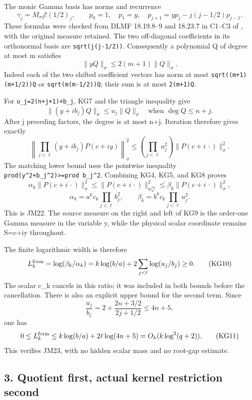 \documentclass[11pt]{article}
\begin{document}
The monic Gamma basis has norms and recurrence \[
\gamma_j=M_\sigma j!(1/2)_j,\qquad
p_0=1,\quad p_1=y,\quad
p_{j+1}=yp_j-j(j-1/2)p_{j-1}.
\tag{KG6}
\] These formulas were checked from DLMF 18.19.8--9 and 18.23.7 in C1--C3 of , with the original measure retained. The two off-diagonal coefficients in its orthonormal basis are \texttt{sqrt(j(j-1/2))}. Consequently a polynomial Q of degree at most m satisfies \[
\|yQ\|_\sigma\le2(m+1)\|Q\|_\sigma.
\tag{KG7}
\] Indeed each of the two shifted coefficient vectors has norm at most \texttt{sqrt((m+1)(m+1/2))\textbar{}\textbar{}Q\textbar{}\textbar{}} or \texttt{sqrt(m(m-1/2))\textbar{}\textbar{}Q\textbar{}\textbar{}}; their sum is at most \texttt{2(m+1)\textbar{}\textbar{}Q\textbar{}\textbar{}}.

For \texttt{u\_j=2(n+j+1)+b\_j}, KG7 and the triangle inequality give \[
\|(y+ib_j)Q\|_\sigma\le u_j\|Q\|_\sigma
\quad\text{when }\deg Q\le n+j.
\] After j preceding factors, the degree is at most n+j. Iteration therefore gives exactly \[
\left\|\prod_{j<\ell}(y+ib_j)P(c+iy)\right\|_\sigma^2
\le\left(\prod_{j<\ell}u_j^2\right)
\|P(c+i\,\cdot)\|_\sigma^2.
\tag{KG8}
\] The matching lower bound uses the pointwise inequality \texttt{prod(y\^{}2+b\_j\^{}2)\textgreater{}=prod\ b\_j\^{}2}. Combining KG4, KG5, and KG8 proves \[
\boxed{\alpha_k\|P(c+i\,\cdot)\|_\sigma^2
\le\|P(c+i\,\cdot)\|_{w_h^{*k}}^2
\le\beta_k\|P(c+i\,\cdot)\|_\sigma^2,}
\tag{KG9}
\] \[
\alpha_k=a^kc_k\prod_{j<\ell}b_j^2,\qquad
\beta_k=b^kc_k\prod_{j<\ell}u_j^2.
\] This is JM22. The source measure on the right and left of KG9 is the order-one Gamma measure in the variable y, while the physical scalar coordinate remains S=c+iy throughout.

The finite logarithmic width is therefore \[
L_k^{\rm form}=\log(\beta_k/\alpha_k)
=k\log(b/a)+2\sum_{j<\ell}\log(u_j/b_j)\ge0.
\tag{KG10}
\] The scalar c\_k cancels in this ratio; it was included in both bounds before the cancellation. There is also an explicit upper bound for the second term. Since \[
\frac{u_j}{b_j}=2+\frac{2n+3/2}{2j+1/2}\le4n+5,
\] one has \[
0\le L_k^{\rm form}\le k\log(b/a)+2\ell\log(4n+5)
=O_h(k\log^2(q+2)).
\tag{KG11}
\] This verifies JM23, with no hidden scalar mass and no root-gap estimate.

\subsection{3. Quotient first, actual kernel restriction second}\label{quotient-first-actual-kernel-restriction-second}
\end{document}
